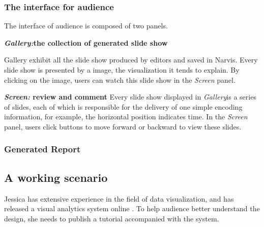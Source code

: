 \subsubsection{The interface for audience}
The interface of audience is composed of two panels.

\textbf{\textit{Gallery:}the collection of generated slide show}
 
Gallery exhibit all the slide show produced by editors and saved in Narvis. Every slide show is presented by a image, the visualization it tends to explain. By clicking on the image, users can watch this slide show in the \textit{Screen} panel. 

\textbf{\textit{Screen:}  review and comment}
Every slide show displayed in \textit{Gallery}is a series of slides, each of which is responsible for the delivery of one simple encoding information, for example, the horizontal position indicates time. In the \textit{Screen} panel, users click buttons to move forward or backward to view these slides. 
\subsubsection{Generated Report}

\subsection{A working scenario}
Jessica has extensive experience in the field of data visualization, and has released a visual analytics system online . To help audience better understand the design, she needs to publish a tutorial accompanied with the system.


